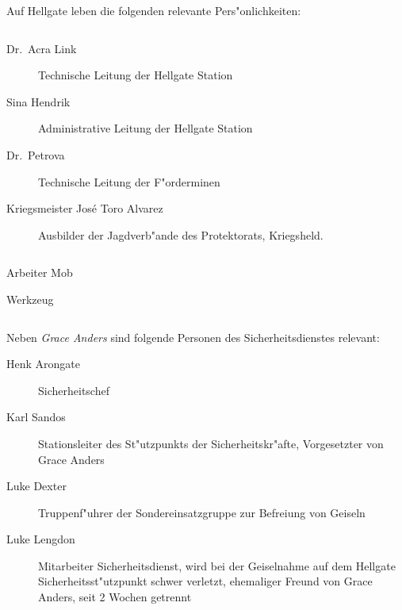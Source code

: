 
Auf Hellgate leben die folgenden relevante Pers"onlichkeiten: 

\begin{column}[l]{0.45}
    \begin{description}
        \item[Dr.~Acra Link] Technische Leitung der Hellgate Station
        \item[Sina Hendrik] Administrative Leitung der Hellgate Station
        \item[Dr.~Petrova] Technische Leitung der F"orderminen
        \item[Kriegsmeister Jos\'{e} \frqq{}Toro\flqq{} Alvarez] Ausbilder der Jagdverb"ande des Protektorats, Kriegsheld.
    \end{description}
\end{column}
\begin{column}[r]{0.45}
    \begin{nscsheet}[h]{Arbeiter Mob}
        \nscstats[]
        \nscruler
        \begin{nscinventory}
            \nscitem[Waffen] Werkzeug
        \end{nscinventory}
    \end{nscsheet}
\end{column}


Neben \emph{Grace Anders} sind folgende Personen des Sicherheitsdienstes relevant:

\begin{description}
    \item[Henk Arongate] Sicherheitschef    
    \item[Karl Sandos] Stationsleiter des St"utzpunkts der Sicherheitskr"afte, Vorgesetzter von Grace Anders
    \item[Luke Dexter] Truppenf"uhrer der Sondereinsatzgruppe zur Befreiung von Geiseln
    \item[Luke Lengdon] Mitarbeiter Sicherheitsdienst, wird bei der Geiselnahme auf dem Hellgate Sicherheitsst"utzpunkt 
        schwer verletzt, ehemaliger Freund von Grace Anders, seit 2 Wochen getrennt
\end{description}

\vfill\pagebreak
